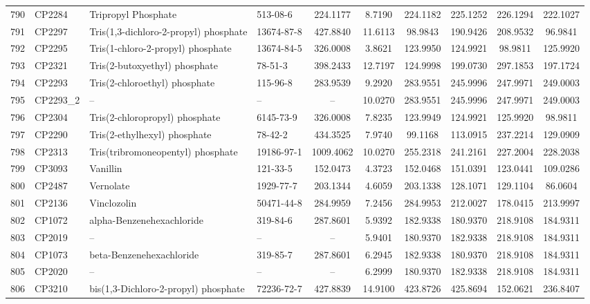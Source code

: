 \begin{longtable}{clllcccccc}
790 & CP2284 & Tripropyl Phosphate & 513-08-6 & 224.1177 & 8.7190 & 224.1182 & 225.1252 & 226.1294 & 222.1027 \\ 
791 & CP2297 & Tris(1,3-dichloro-2-propyl) phosphate & 13674-87-8 & 427.8840 & 11.6113 & 98.9843 & 190.9426 & 208.9532 & 96.9841 \\ 
792 & CP2295 & Tris(1-chloro-2-propyl) phosphate & 13674-84-5 & 326.0008 & 3.8621 & 123.9950 & 124.9921 & 98.9811 & 125.9920 \\ 
793 & CP2321 & Tris(2-butoxyethyl) phosphate & 78-51-3 & 398.2433 & 12.7197 & 124.9998 & 199.0730 & 297.1853 & 197.1724 \\ 
794 & CP2293 & Tris(2-chloroethyl) phosphate & 115-96-8 & 283.9539 & 9.2920 & 283.9551 & 245.9996 & 247.9971 & 249.0003 \\ 
795 & CP2293\_2 & – & – & – & 10.0270 & 283.9551 & 245.9996 & 247.9971 & 249.0003 \\ 
796 & CP2304 & Tris(2-chloropropyl) phosphate & 6145-73-9 & 326.0008 & 7.8235 & 123.9949 & 124.9921 & 125.9920 & 98.9811 \\ 
797 & CP2290 & Tris(2-ethylhexyl) phosphate & 78-42-2 & 434.3525 & 7.9740 & 99.1168 & 113.0915 & 237.2214 & 129.0909 \\ 
798 & CP2313 & Tris(tribromoneopentyl) phosphate & 19186-97-1 & 1009.4062 & 10.0270 & 255.2318 & 241.2161 & 227.2004 & 228.2038 \\ 
799 & CP3093 & Vanillin & 121-33-5 & 152.0473 & 4.3723 & 152.0468 & 151.0391 & 123.0441 & 109.0286 \\ 
800 & CP2487 & Vernolate\smash{\textsuperscript{\textdaggerdbl}} & 1929-77-7 & 203.1344 & 4.6059 & 203.1338 & 128.1071 & 129.1104 & 86.0604 \\ 
801 & CP2136 & Vinclozolin & 50471-44-8 & 284.9959 & 7.2456 & 284.9953 & 212.0027 & 178.0415 & 213.9997 \\ 
802 & CP1072 & alpha-Benzenehexachloride & 319-84-6 & 287.8601 & 5.9392 & 182.9338 & 180.9370 & 218.9108 & 184.9311 \\ 
803 & CP2019 & – & – & – & 5.9401 & 180.9370 & 182.9338 & 218.9108 & 184.9311 \\ 
804 & CP1073 & beta-Benzenehexachloride & 319-85-7 & 287.8601 & 6.2945 & 182.9338 & 180.9370 & 218.9108 & 184.9311 \\ 
805 & CP2020 & – & – & – & 6.2999 & 180.9370 & 182.9338 & 218.9108 & 184.9311 \\ 
806 & CP3210 & bis(1,3-Dichloro-2-propyl) phosphate & 72236-72-7 & 427.8839 & 14.9100 & 423.8726 & 425.8694 & 152.0621 & 236.8407 \\ 

\end{longtable}
